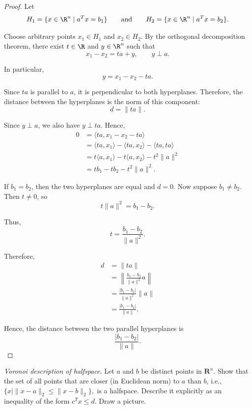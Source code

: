 \documentclass[12pt]{book}
\begin{document}
\begin{proof}
    Let
    \[
        H_1=\{x\in\R^n\mid a^Tx=b_1\}
        \qquad\text{and}\qquad
        H_2=\{x\in\R^n\mid a^Tx=b_2\}.
    \]

    Choose arbitrary points $x_1\in H_1$ and $x_2\in H_2$. By the
    orthogonal decomposition theorem, there exist $t\in\R$ and
    $y\in\R^n$ such that
    \[
        x_1-x_2=ta+y,
        \qquad y\perp a.
    \]

    In particular,
    \[
        y=x_1-x_2-ta.
    \]

    Since $ta$ is parallel to $a$, it is perpendicular to both
    hyperplanes. Therefore, the distance between the hyperplanes is
    the norm of this component:
    \[
        d=\|ta\|.
    \]

    Since $y\perp a$, we also have $y\perp ta$. Hence,
    \[
    \begin{aligned}
        0
        &=\langle ta,x_1-x_2-ta\rangle \\
        &=\langle ta,x_1\rangle
          -\langle ta,x_2\rangle
          -\langle ta,ta\rangle \\
        &=t\langle a,x_1\rangle
          -t\langle a,x_2\rangle
          -t^2\|a\|^2 \\
        &=tb_1-tb_2-t^2\|a\|^2.
    \end{aligned}
    \]

    If $b_1=b_2$, then the two hyperplanes are equal and $d=0$.
    Now suppose $b_1\neq b_2$. Then $t\neq0$, so
    \[
        t\|a\|^2=b_1-b_2.
    \]

    Thus,
    \[
        t=\frac{b_1-b_2}{\|a\|^2}.
    \]

    Therefore,
    \[
    \begin{aligned}
        d
        &=\|ta\| \\
        &=\left\|
            \frac{b_1-b_2}{\|a\|^2}a
        \right\| \\
        &=\frac{|b_1-b_2|}{\|a\|^2}\|a\| \\
        &=\frac{|b_1-b_2|}{\|a\|}.
    \end{aligned}
    \]

    Hence, the distance between the two parallel hyperplanes is
    \[
        \frac{|b_1-b_2|}{\|a\|}.
    \]
\end{proof}


\newpage


\begin{exercise}
    \textit{Voronoi description of halfspace.} Let $a$ and $b$ be distinct points in $\mathbf{R}^n$. Show that the set of all points that are closer (in Euclidean norm) to $a$ than $b$, i.e.,
        $
        \{x \mid \|x - a\|_2 \leq \|x - b\|_2\},
        $
    is a halfspace. Describe it explicitly as an inequality of the form $c^T x \leq d$. Draw a picture.
\end{exercise}
\end{document}
